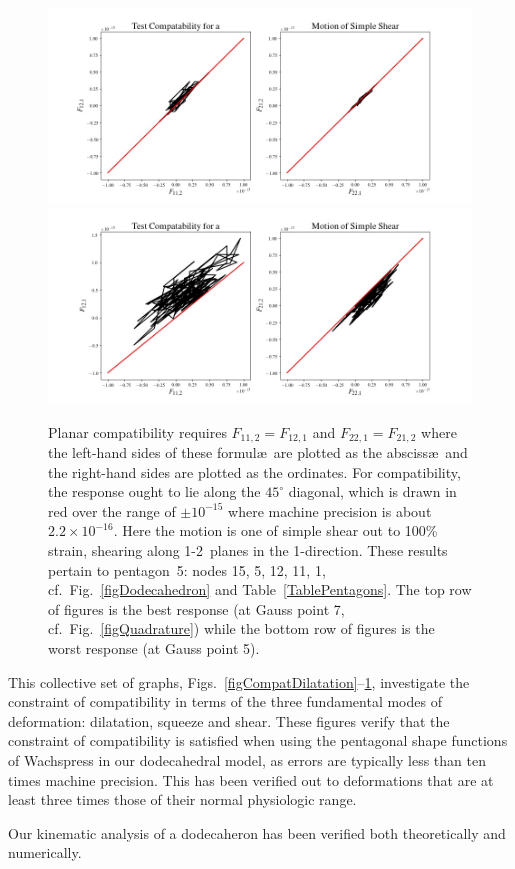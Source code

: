 \begin{figure}
	\centering
	\includegraphics[width=\textwidth]{figures/compatibilitySimpleShearP5G7.jpg}
	\includegraphics[width=\textwidth]{figures/compatibilitySimpleShearP5G5.jpg}
	\caption{Planar compatibility requires $F_{11,2} = F_{12,1}$ and $F_{22,1} = F_{21,2}$ where the left-hand sides of these formul\ae\ are plotted as the absciss\ae\ and the right-hand sides are plotted as the ordinates.  For compatibility, the response ought to lie along the $45^{\circ}$ diagonal, which is drawn in red over the range of $\pm 10^{-15}$ where machine precision is about $2.2 \times 10^{-16}$.  Here the motion is one of simple shear out to 100\% strain, shearing along 1-2~planes in the 1-direction.  These results pertain to pentagon~5: nodes 15, 5, 12, 11, 1, cf.\ Fig.~\ref{figDodecahedron} and Table~\ref{TablePentagons}.  The top row of figures is the best response (at Gauss point 7, cf.\ Fig.~\ref{figQuadrature}) while the bottom row of figures is the worst response (at Gauss point 5).}
	\label{figCompatSimpleShearP5}
\end{figure}

This collective set of graphs, Figs.~\ref{figCompatDilatation}--\ref{figCompatSimpleShearP5}, investigate the constraint of compatibility in terms of the three fundamental modes of deformation: dilatation, squeeze and shear.  These figures verify that the constraint of compatibility is satisfied when using the pentagonal shape functions of Wachspress \cite{Wachspress75,Wachspress16} in our dodecahedral model, as errors are typically less than ten times machine precision.  This has been verified out to deformations that are at least three times those of their normal physiologic range.

Our kinematic analysis of a dodecaheron has been verified both theoretically and numerically.

